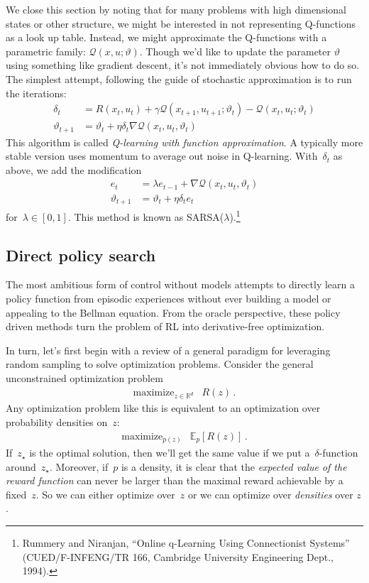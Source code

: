 \documentclass{tufte-book}
\begin{document}
We close this section by noting that for many problems with high
dimensional states or other structure, we might be interested in not
representing Q-functions as a look up table. Instead, we might
approximate the Q-functions with a parametric family:
\(\mathcal{Q}(x,u;\vartheta)\). Though we'd like to update the parameter
\(\vartheta\) using something like gradient descent, it's not
immediately obvious how to do so. The simplest attempt, following the
guide of stochastic approximation is to run the iterations: \[
\begin{aligned}
\delta_t  &= R(x_{t},u_{t}) + \gamma  \mathcal{Q}(x_{t+1},u_{t+1}; \vartheta_{t})
- \mathcal{Q}(x_t,u_t;\vartheta_t)\\
\vartheta_{t+1} &= \vartheta_t + \eta \delta_t \nabla \mathcal{Q}(x_t,u_t,\vartheta_t)
\end{aligned}
\] This algorithm is called \emph{Q-learning with function
approximation}. A typically more stable version uses momentum to average
out noise in Q-learning. With~\(\delta_t\) as above, we add the
modification \[
\begin{aligned}
e_{t} &= \lambda e_{t-1} + \nabla \mathcal{Q}(x_t,u_t,\vartheta_t)\\
\vartheta_{t+1} &= \vartheta_t + \eta \delta_t e_t
\end{aligned}
\] for~\(\lambda \in [0,1]\). This method is known as
SARSA(\(\lambda\)).\footnote{Rummery and Niranjan, {``Online q-Learning
  Using Connectionist Systems''} (CUED/F-INFENG/TR 166, Cambridge
  University Engineering Dept., 1994).}

\hypertarget{direct-policy-search}{%
\subsection{Direct policy search}\label{direct-policy-search}}

The most ambitious form of control without models attempts to directly
learn a policy function from episodic experiences without ever building
a model or appealing to the Bellman equation. From the oracle
perspective, these policy driven methods turn the problem of RL into
derivative-free optimization.

In turn, let's first begin with a review of a general paradigm for
leveraging random sampling to solve optimization problems. Consider the
general unconstrained optimization problem \[
\begin{array}{ll}
    \text{maximize}_{z\in\mathbb{R}^d} & R(z) \,.
    \end{array}
\] Any optimization problem like this is equivalent to an optimization
over probability densities on~\(z\): \[
\begin{array}{ll}
    \text{maximize}_{p(z)} & \mathbb{E}_p[R(z)] \,.
\end{array}
\] If~\(z_\star\) is the optimal solution, then we'll get the same value
if we put a~\(\delta\)-function around~\(z_\star\). Moreover, if~\(p\)
is a density, it is clear that the
\emph{expected value of the reward function} can never be larger than
the maximal reward achievable by a fixed~\(z\). So we can either
optimize over~\(z\) or we can optimize over \emph{densities} over \(z\).
\end{document}
